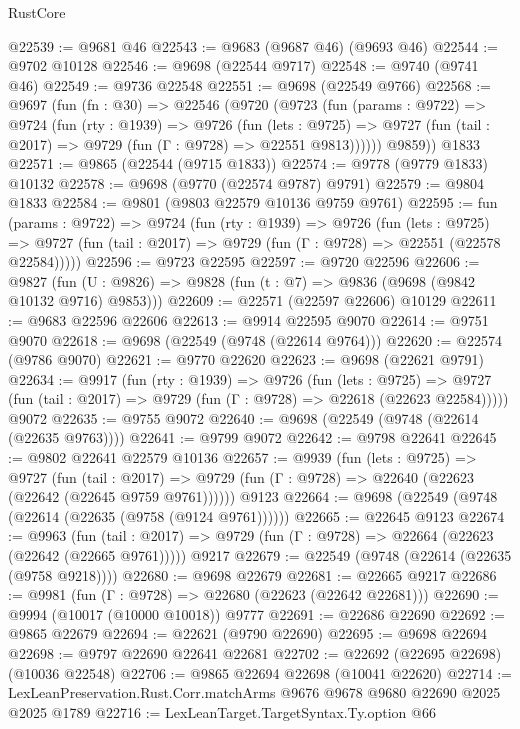 \begin{lexlean}{RustCore}
\begin{coremodule}
@22539 := @9681 @46
@22543 := @9683 (@9687 @46) (@9693 @46)
@22544 := @9702 @10128
@22546 := @9698 (@22544 @9717)
@22548 := @9740 (@9741 @46)
@22549 := @9736 @22548
@22551 := @9698 (@22549 @9766)
@22568 := @9697
    (fun (fn : @30) =>
    @22546
      (@9720
        (@9723
          (fun (params : @9722) =>
          @9724
            (fun (rty : @1939) =>
            @9726
              (fun (lets : @9725) =>
              @9727 (fun (tail : @2017) => @9729 (fun (Γ : @9728) => @22551 @9813))))))
        @9859))
    @1833
@22571 := @9865 (@22544 (@9715 @1833))
@22574 := @9778 (@9779 @1833) @10132
@22578 := @9698 (@9770 (@22574 @9787) @9791)
@22579 := @9804 @1833
@22584 := @9801 (@9803 @22579 @10136 @9759 @9761)
@22595 := fun (params : @9722) =>
  @9724
    (fun (rty : @1939) =>
    @9726
      (fun (lets : @9725) =>
      @9727 (fun (tail : @2017) => @9729 (fun (Γ : @9728) => @22551 (@22578 @22584)))))
@22596 := @9723 @22595
@22597 := @9720 @22596
@22606 := @9827
    (fun (U : @9826) => @9828 (fun (t : @7) => @9836 (@9698 (@9842 @10132 @9716) @9853)))
@22609 := @22571 (@22597 @22606) @10129
@22611 := @9683 @22596 @22606
@22613 := @9914 @22595 @9070
@22614 := @9751 @9070
@22618 := @9698 (@22549 (@9748 (@22614 @9764)))
@22620 := @22574 (@9786 @9070)
@22621 := @9770 @22620
@22623 := @9698 (@22621 @9791)
@22634 := @9917
    (fun (rty : @1939) =>
    @9726
      (fun (lets : @9725) =>
      @9727 (fun (tail : @2017) => @9729 (fun (Γ : @9728) => @22618 (@22623 @22584)))))
    @9072
@22635 := @9755 @9072
@22640 := @9698 (@22549 (@9748 (@22614 (@22635 @9763))))
@22641 := @9799 @9072
@22642 := @9798 @22641
@22645 := @9802 @22641 @22579 @10136
@22657 := @9939
    (fun (lets : @9725) =>
    @9727
      (fun (tail : @2017) =>
      @9729 (fun (Γ : @9728) => @22640 (@22623 (@22642 (@22645 @9759 @9761))))))
    @9123
@22664 := @9698 (@22549 (@9748 (@22614 (@22635 (@9758 (@9124 @9761))))))
@22665 := @22645 @9123
@22674 := @9963
    (fun (tail : @2017) => @9729 (fun (Γ : @9728) => @22664 (@22623 (@22642 (@22665 @9761)))))
    @9217
@22679 := @22549 (@9748 (@22614 (@22635 (@9758 @9218))))
@22680 := @9698 @22679
@22681 := @22665 @9217
@22686 := @9981 (fun (Γ : @9728) => @22680 (@22623 (@22642 @22681)))
@22690 := @9994 (@10017 (@10000 @10018)) @9777
@22691 := @22686 @22690
@22692 := @9865 @22679
@22694 := @22621 (@9790 @22690)
@22695 := @9698 @22694
@22698 := @9797 @22690 @22641 @22681
@22702 := @22692 (@22695 @22698) (@10036 @22548)
@22706 := @9865 @22694 @22698 (@10041 @22620)
@22714 := LexLeanPreservation.Rust.Corr.matchArms @9676 @9678 @9680 @22690 @2025 @2025 @1789
@22716 := LexLeanTarget.TargetSyntax.Ty.option @66

\end{coremodule}
\end{lexlean}

